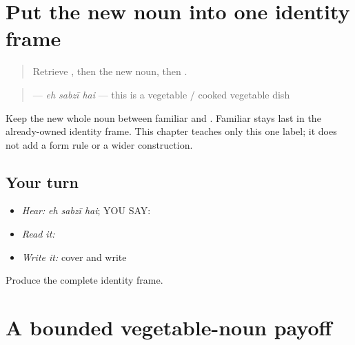 \section[\texorpdfstring{\pa{ਇਹ} \pa{ਸਬਜ਼ੀ} \pa{ਹੈ} (eh sabzi hai)}{ਇਹ ਸਬਜ਼ੀ ਹੈ (eh sabzi hai)}]{Put the new noun into one identity frame}

\label{lesson:PA-C200-vegetable-label}



\begin{quote}
Retrieve \textbf{}, then the new noun, then \textbf{}.
\end{quote}

\begin{grammarlens}[title={Grammar Lens}]
\begin{quote}
\textbf{  } — \emph{eh sabzī hai} — this is a vegetable / cooked vegetable dish
\end{quote}

Keep the new whole noun between familiar \textbf{} and \textbf{}. Familiar \textbf{} stays last in the already-owned identity frame. This chapter teaches only this one label; it does not add a form rule or a wider construction.
\end{grammarlens}

\subsection*{Your turn}
\begin{itemize}
\raggedright
  \item \emph{Hear:} \emph{eh sabzī hai}; YOU SAY: \textbf{  }
  \item \emph{Read it:} \textbf{  }
  \item \emph{Write it:} cover and write \textbf{  }
\end{itemize}

\begin{tcolorbox}[breakable,colback=teal!4,colframe=teal!35!black,title={Before you move on}]
Produce the complete identity frame.
\end{tcolorbox}
\section[\texorpdfstring{\pa{ਇਹ} \pa{ਸਬਜ਼ੀ} \pa{ਹੈ} (eh sabzi hai)}{ਇਹ ਸਬਜ਼ੀ ਹੈ (eh sabzi hai)}]{A bounded vegetable-noun payoff}

